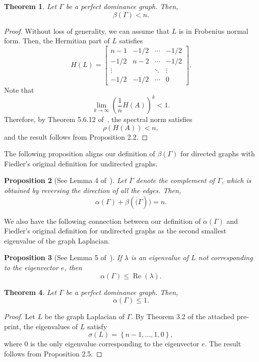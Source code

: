 \documentclass{article}
\newtheorem{theorem}{Theorem}[section]
\newtheorem{proposition}[theorem]{Proposition}
\newcommand*\conj[1]{\overline{#1}}
\newcommand\re[1]{\operatorname{Re}\left(#1\right)}
\begin{document}
\begin{theorem}
Let $\Gamma$ be a perfect dominance graph.
Then,
\[
\beta(\Gamma)<n.
\]
\end{theorem}
\begin{proof}
Without loss of generality, we can assume that $L$ is in Frobenius normal form.
Then, the Hermitian part of $L$ satisfies
\[
H(L)=\begin{bmatrix} n-1 & -1/2 & \cdots & -1/2 \\
				-1/2 & n-2 & \cdots & -1/2 \\
				\vdots & & \ddots & \vdots \\
				-1/2 & -1/2 & \cdots & 0 \end{bmatrix}.
\]
Note that
\[
\lim_{k\rightarrow\infty}\left(\frac{1}{n}H(A)\right)^{k} < 1.
\]
Therefore, by Theorem 5.6.12 of~\cite{Horn2013}, the spectral norm satisfies
\[
\rho(H(A))<n,
\]
and the result follows from Proposition 2.2. 
\end{proof}

The following proposition aligns our definition of $\beta(\Gamma)$ for directed graphs with Fiedler's original definition for undirected graphs.

\begin{proposition}[See Lemma 4 of~\cite{Wu2005-1}]
Let $\conj{\Gamma}$ denote the complement of $\Gamma$, which is obtained by reversing the direction of all the edges.
Then,
\[
\alpha(\Gamma)+\beta(\conj(\Gamma))=n.
\]
\end{proposition}

We also have the following connection between our definition of $\alpha(\Gamma)$ and Fiedler's original definition for undirected graphs as the second smallest eigenvalue of the graph Laplacian.

\begin{proposition}[See Lemma 5 of~\cite{Wu2005-1}]
If $\lambda$ is an eigenvalue of $L$ not corresponding to the eigenvector $e$, then
\[
\alpha(\Gamma)\leq\re{\lambda}.
\]
\end{proposition}

\begin{theorem}
Let $\Gamma$ be a perfect dominance graph.
Then,
\[
\alpha(\Gamma)\leq 1.
\]
\end{theorem}
\begin{proof}
Let $L$ be the graph Laplacian of $\Gamma$. 
By Theorem 3.2 of the attached pre-print, the eigenvalues of $L$ satisfy
\[
\sigma(L)=\left\{n-1,\ldots,1,0\right\},
\]
where $0$ is the only eigenvalue corresponding to the eigenvector $e$. 
The result follows from Proposition 2.5.
\end{proof}
\end{document}
